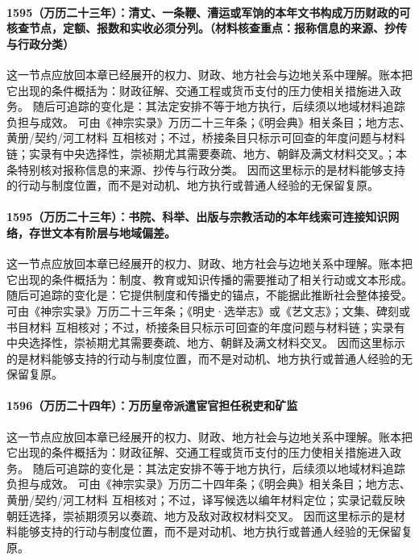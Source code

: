 \paragraph{1595（万历二十三年）：清丈、一条鞭、漕运或军饷的本年文书构成万历财政的可核查节点，定额、报数和实收必须分列。（材料核查重点：报称信息的来源、抄传与行政分类）} 这一节点应放回本章已经展开的权力、财政、地方社会与边地关系中理解。账本把它出现的条件概括为：财政征解、交通工程或货币支付的压力使相关措施进入政务。 随后可追踪的变化是：其法定安排不等于地方执行，后续须以地域材料追踪负担与成效。 可由《神宗实录》万历二十三年条；《明会典》相关条目；地方志、黄册/契约/河工材料 互相核对；不过，桥接条目只标示可回查的年度问题与材料链；实录有中央选择性，崇祯期尤其需要奏疏、地方、朝鲜及满文材料交叉。；本条特别核对报称信息的来源、抄传与行政分类。 因而这里标示的是材料能够支持的行动与制度位置，而不是对动机、地方执行或普通人经验的无保留复原。

\paragraph{1595（万历二十三年）：书院、科举、出版与宗教活动的本年线索可连接知识网络，存世文本有阶层与地域偏差。} 这一节点应放回本章已经展开的权力、财政、地方社会与边地关系中理解。账本把它出现的条件概括为：制度、教育或知识传播的需要推动了相关行动或文本形成。 随后可追踪的变化是：它提供制度和传播史的锚点，不能据此推断社会整体接受。 可由《神宗实录》万历二十三年条；《明史·选举志》或《艺文志》；文集、碑刻或书目材料 互相核对；不过，桥接条目只标示可回查的年度问题与材料链；实录有中央选择性，崇祯期尤其需要奏疏、地方、朝鲜及满文材料交叉。 因而这里标示的是材料能够支持的行动与制度位置，而不是对动机、地方执行或普通人经验的无保留复原。

\paragraph{1596（万历二十四年）：万历皇帝派遣宦官担任税吏和矿监} 这一节点应放回本章已经展开的权力、财政、地方社会与边地关系中理解。账本把它出现的条件概括为：财政征解、交通工程或货币支付的压力使相关措施进入政务。 随后可追踪的变化是：其法定安排不等于地方执行，后续须以地域材料追踪负担与成效。 可由《神宗实录》万历二十四年条；《明会典》相关条目；地方志、黄册/契约/河工材料 互相核对；不过，译写候选以编年材料定位；实录记载反映朝廷选择，崇祯期须另以奏疏、地方及敌对政权材料交叉。 因而这里标示的是材料能够支持的行动与制度位置，而不是对动机、地方执行或普通人经验的无保留复原。

